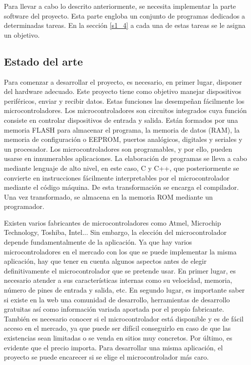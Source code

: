 Para llevar a cabo lo descrito anteriormente, se necesita implementar la parte software del proyecto. Esta parte engloba un conjunto de programas dedicados a determinadas tareas. En la sección \ref{s1_4} a cada una de estas tareas se le asigna un objetivo.

\subsection{Estado del arte} \label{s1_3_1}

Para comenzar a desarrollar el proyecto, es necesario, en primer lugar, disponer del hardware adecuado. Este proyecto tiene como objetivo manejar dispositivos periféricos, enviar y recibir datos. Estas funciones las desempeñan fácilmente los microcontroladores.
Los microcontroladores son circuitos integrados cuya función consiste en controlar dispositivos de entrada y salida. Están formados por una memoria FLASH para almacenar el programa, la memoria de datos (RAM), la memoria de configuración o EEPROM, puertos analógicos, digitales y seriales y un procesador. Los microcontroladores son programables, y por ello, pueden usarse en innumerables aplicaciones. La elaboración de programas se lleva a cabo mediante lenguaje de alto nivel, en este caso, C y C++, que posteriormente se convierte en instrucciones fácilmente interpretables por el microcontrolador mediante el código máquina. De esta transformación se encarga el compilador. Una vez transformado, se almacena en la memoria ROM mediante un programador.

Existen varios fabricantes de microcontroladores como Atmel, Microchip Technology, Toshiba, Intel... Sin embargo, la elección del microcontrolador depende fundamentalmente de la aplicación. Ya que hay varios microcontroladores en el mercado con los que se puede implementar la misma aplicación, hay que tener en cuenta algunos aspectos antes de elegir definitivamente el microcontrolador que se pretende usar. En primer lugar, es necesario atender a sus características internas como su velocidad, memoria, número de pines de entrada y salida, etc. En segundo lugar, es importante saber si existe en la web una comunidad de desarrollo, herramientas de desarrollo gratuitas así como información variada aportada por el propio fabricante. También es necesario conocer si el microcontrolador está disponible y es de fácil acceso en el mercado, ya que puede ser difícil conseguirlo en caso de que las existencias sean limitadas o se venda en sitios muy concretos. Por último, es evidente que el precio importa. Para desarrollar una misma aplicación, el proyecto se puede encarecer si se elige el microcontrolador más caro.

